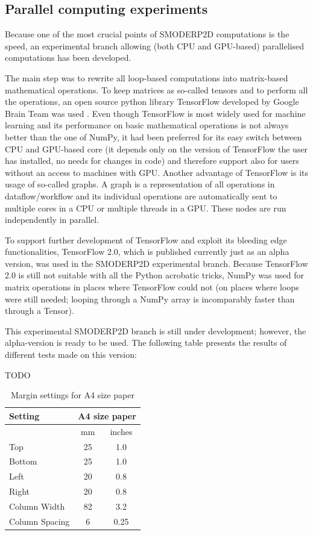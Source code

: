 \subsection{Parallel computing experiments}

Because one of the most crucial points of SMODERP2D computations is
the speed, an experimental branch allowing (both CPU and GPU-based)
parallelised computations has been developed.

The main step was to rewrite all loop-based computations into
matrix-based mathematical operations. To keep matrices as so-called
tensors and to perform all the operations, an open source python
library TensorFlow developed by Google Brain Team was used \cite{xxx}.
Even though TensorFlow is most widely used for machine learning and
its performance on basic mathematical operations is not always better
than the one of NumPy, it had been preferred for its easy switch
between CPU and GPU-based core (it depends only on the version of
TensorFlow the user has installed, no needs for changes in code) and
therefore support also for users without an access to machines with
GPU. Another advantage of TensorFlow is its usage of so-called
graphs. A graph is a representation of all operations in
dataflow/workflow and its individual operations are automatically sent
to multiple cores in a CPU or multiple threads in a GPU. These nodes
are run independently in parallel.

To support further development of TensorFlow and exploit its bleeding
edge functionalities, TensorFlow 2.0, which is published currently
just as an alpha version, was used in the SMODERP2D experimental
branch. Because TensorFlow 2.0 is still not suitable with all the
Python acrobatic tricks, NumPy was used for matrix operations in
places where TensorFlow could not (on places where loops were still
needed; looping through a NumPy array is incomparably faster than
through a Tensor).

This experimental SMODERP2D branch is still under development;
however, the alpha-version is ready to be used. The following table
presents the results of different tests made on this version:

TODO

\begin{table}[h]
  \centering
  \begin{tabular}{|l|c|c|}\hline
    Setting&\multicolumn{2}{c|}{A4 size paper}\\\hline
    &mm&inches\\
    Top&25&1.0\\
    Bottom&25&1.0\\
    Left&20&0.8\\
    Right&20&0.8\\
    Column Width&82&3.2\\
    Column Spacing&6&0.25\\\hline
  \end{tabular}
  \caption{Margin settings for A4 size paper}
  \label{tab:Margin_settings}
\end{table}

